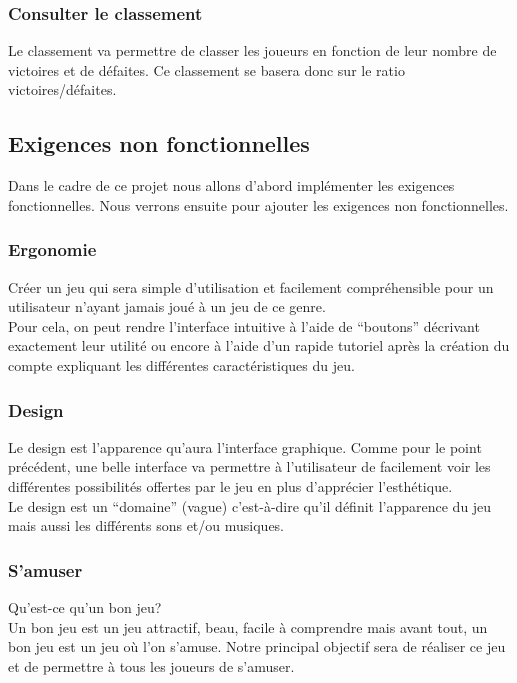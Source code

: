 \documentclass[11pt,a4paper]{article}
\begin{document}
\subsubsection*{Consulter le classement}

Le classement va permettre de classer les joueurs en fonction de
leur nombre de victoires et de défaites. Ce classement se
basera donc sur le ratio victoires/défaites.


\subsection{Exigences non fonctionnelles}
\label{sec:exi-nonfonc}

Dans le cadre de ce projet nous allons d'abord implémenter les exigences fonctionnelles.  Nous verrons ensuite pour ajouter les exigences non fonctionnelles.


\subsubsection*{Ergonomie}
Créer un jeu qui sera simple d'utilisation et facilement compréhensible pour un utilisateur n'ayant jamais joué à un jeu de ce genre.\\
Pour cela, on peut rendre l'interface intuitive à l'aide de ``boutons'' décrivant exactement leur utilité ou encore à l'aide d'un rapide tutoriel après la création du compte expliquant les différentes caractéristiques du jeu.


\subsubsection*{Design}
Le design est l'apparence qu'aura l'interface graphique. Comme pour le point précédent, une belle interface va permettre à l'utilisateur de facilement voir les différentes possibilités offertes par le jeu en plus d'apprécier l'esthétique.\\
Le design est un ``domaine'' (vague) c'est-à-dire qu'il définit l'apparence du jeu mais aussi les différents sons et/ou musiques.


\subsubsection*{S'amuser}
Qu'est-ce qu'un bon jeu?\\
Un bon jeu est un jeu attractif, beau, facile à comprendre mais avant tout, un bon jeu est un jeu où l'on s'amuse. Notre principal objectif sera de réaliser ce jeu et de permettre à tous les joueurs de s'amuser.
\end{document}
